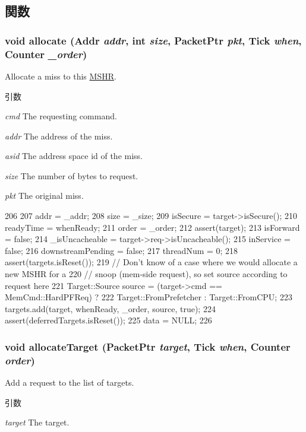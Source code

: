 \subsection{関数}
\hypertarget{classMSHR_aea3dd4d447084fd85a6d737beefdc594}{
\subsubsection[{allocate}]{\setlength{\rightskip}{0pt plus 5cm}void allocate ({\bf Addr} {\em addr}, \/  int {\em size}, \/  {\bf PacketPtr} {\em pkt}, \/  {\bf Tick} {\em when}, \/  {\bf Counter} {\em \_\-order})}}
\label{classMSHR_aea3dd4d447084fd85a6d737beefdc594}
Allocate a miss to this \hyperlink{classMSHR}{MSHR}. 
\begin{DoxyParams}{引数}
\item[{\em cmd}]The requesting command. \item[{\em addr}]The address of the miss. \item[{\em asid}]The address space id of the miss. \item[{\em size}]The number of bytes to request. \item[{\em pkt}]The original miss. \end{DoxyParams}



\begin{DoxyCode}
206 {
207     addr = _addr;
208     size = _size;
209     isSecure = target->isSecure();
210     readyTime = whenReady;
211     order = _order;
212     assert(target);
213     isForward = false;
214     _isUncacheable = target->req->isUncacheable();
215     inService = false;
216     downstreamPending = false;
217     threadNum = 0;
218     assert(targets.isReset());
219     // Don't know of a case where we would allocate a new MSHR for a
220     // snoop (mem-side request), so set source according to request here
221     Target::Source source = (target->cmd == MemCmd::HardPFReq) ?
222         Target::FromPrefetcher : Target::FromCPU;
223     targets.add(target, whenReady, _order, source, true);
224     assert(deferredTargets.isReset());
225     data = NULL;
226 }
\end{DoxyCode}
\hypertarget{classMSHR_a84c132450efb0381229d03bba92d3d1d}{
\subsubsection[{allocateTarget}]{\setlength{\rightskip}{0pt plus 5cm}void allocateTarget ({\bf PacketPtr} {\em target}, \/  {\bf Tick} {\em when}, \/  {\bf Counter} {\em order})}}
\label{classMSHR_a84c132450efb0381229d03bba92d3d1d}
Add a request to the list of targets. 
\begin{DoxyParams}{引数}
\item[{\em target}]The target. \end{DoxyParams}



